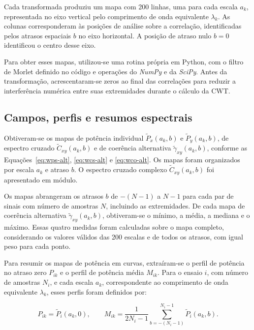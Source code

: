 \noindent
Cada transformada produziu um mapa com 200 linhas, uma para cada escala
$a_k$, representada no eixo vertical pelo comprimento de onda equivalente
$\lambda_k$. As colunas corresponderam às posições de análise sobre a
correlação, identificadas pelos atrasos espaciais $b$ no eixo horizontal.
A posição de atraso nulo $b=0$ identificou o centro desse eixo.

Para obter esses mapas, utilizou-se uma rotina própria em Python, com o
filtro de Morlet definido no código e operações do \textit{NumPy} e da
\textit{SciPy}. Antes da transformação, acrescentaram-se zeros ao final
das correlações para reduzir a interferência numérica entre suas
extremidades durante o cálculo da CWT.

\subsection{Campos, perfis e resumos espectrais}\label{sec:met-analise}

Obtiveram-se os mapas de potência individual $\widetilde P_x(a_k,b)$ e
$\widetilde P_y(a_k,b)$, de espectro cruzado $\widetilde C_{xy}(a_k,b)$
e de coerência alternativa $\widetilde\gamma_{xy}(a_k,b)$, conforme as
Equações~\ref{eq:wps-alt}, \ref{eq:wcs-alt} e \ref{eq:wco-alt}.
Os mapas foram organizados por escala $a_k$ e atraso $b$.
O espectro cruzado complexo $\widetilde C_{xy}(a_k,b)$ foi apresentado em módulo.

Os mapas abrangeram os atrasos $b$ de $-(N-1)$ a $N-1$ para cada par de
sinais com número de amostras $N$, incluindo as extremidades.
De cada mapa de coerência alternativa $\widetilde\gamma_{xy}(a_k,b)$,
obtiveram-se o mínimo, a média, a mediana e o máximo. Essas quatro medidas
foram calculadas sobre o mapa completo, considerando os valores válidos das
200 escalas e de todos os atrasos, com igual peso para cada ponto.

Para resumir os mapas de potência em curvas, extraíram-se o perfil de
potência no atraso zero $P_{ik}$ e o perfil de potência média $M_{ik}$.
Para o ensaio $i$, com número de amostras $N_i$, e cada escala $a_k$,
correspondente ao comprimento de onda equivalente $\lambda_k$, esses
perfis foram definidos por:

\begin{equation}\label{eq:met-perfis}
  P_{ik}=\widetilde P_i(a_k,0),\qquad
  M_{ik}=\frac{1}{2N_i-1}\sum_{b=-(N_i-1)}^{N_i-1}\widetilde P_i(a_k,b).
\end{equation}

